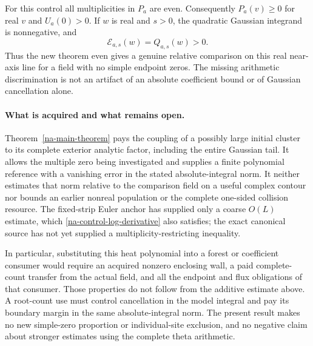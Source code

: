 For this control all multiplicities in $P_a$ are even. Consequently
$P_a(v)\ge0$ for real $v$ and $U_a(0)>0$. If $w$ is real and
$s>0$, the quadratic Gaussian integrand is nonnegative, and
\[
 \mathcal E_{a,s}(w)=Q_{a,s}(w)>0.
\]
Thus the new theorem even gives a genuine relative comparison on this
real near-axis line for a field with no simple endpoint zeros. The
missing arithmetic discrimination is not an artifact of an absolute
coefficient bound or of Gaussian cancellation alone.

\paragraph{What is acquired and what remains open.}
Theorem~\ref{na-main-theorem} pays the coupling of a possibly large
initial cluster to its complete exterior analytic factor, including
the entire Gaussian tail. It allows the multiple zero being investigated
and supplies a finite polynomial reference with a vanishing error in
the stated absolute-integral norm. It neither estimates that norm
relative to the comparison field on a useful complex contour nor
bounds an earlier nonreal population or the complete one-sided
collision resource. The fixed-strip Euler anchor has supplied only
a coarse $O(L)$ estimate, which \eqref{na-control-log-derivative}
also satisfies; the exact canonical source has not yet supplied a
multiplicity-restricting inequality.

In particular, substituting this heat polynomial into a forest or
coefficient consumer would require an acquired nonzero enclosing wall,
a paid complete-count transfer from the actual field, and all the
endpoint and flux obligations of that consumer. Those properties do
not follow from the additive estimate above. A root-count use must
control cancellation in the model integral and pay its boundary margin
in the same absolute-integral norm. The present result makes no new
simple-zero proportion or individual-site exclusion, and no negative
claim about stronger estimates using the complete theta arithmetic.

